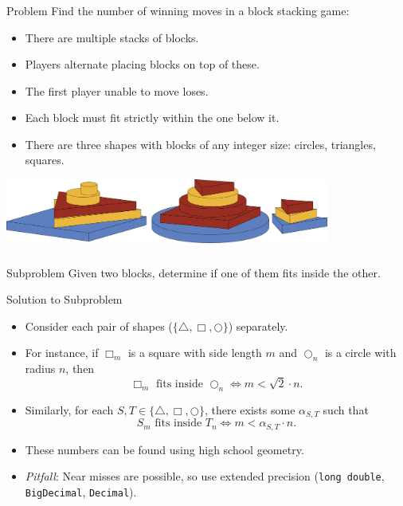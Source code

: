 \begin{frame}
  \frametitle{\problemtitle}
  \begin{block}{Problem}
    Find the number of winning moves in a block stacking game:
    \begin{itemize}
      \item There are multiple stacks of blocks.
      \item Players alternate placing blocks on top of these.
      \item The first player unable to move loses.
      \item Each block must fit strictly within the one below it.
      \item There are three shapes with blocks of any integer size: circles, triangles, squares.
    \end{itemize} 
  \end{block}
  \vspace{5mm}
  \centering
  \includegraphics[width=0.8\textwidth]{image}
\end{frame}
\begin{frame}
  \frametitle{\problemtitle}
  \begin{block}{Subproblem}
    Given two blocks, determine if one of them fits inside the other.
  \end{block}
  \pause
  \begin{block}{Solution to Subproblem}
    \begin{itemize}
      \item<+-> Consider each pair of shapes ($\{\triangle,\Box,\bigcirc\}$) separately.
      \item<+-> For instance, if $\Box_m$ is a square with side length $m$ and $\bigcirc_n$ is a circle with radius $n$, then
        \[ \text{$\Box_m$ fits inside $\bigcirc_n$} \iff m < \sqrt{2}\cdot n. \]
      \item<+-> Similarly, for each $S,T\in\{\triangle,\Box,\bigcirc\}$, there exists some $\alpha_{S,T}$ such that
        \[ \text{$S_m$ fits inside $T_n$} \iff m < \alpha_{S,T}\cdot n. \]
      \item<+-> These numbers can be found using high school geometry. %
      \item<+-> \emph{Pitfall}: Near misses are possible, so use extended precision (\texttt{long double}, \texttt{BigDecimal}, \texttt{Decimal}).
    \end{itemize}
  \end{block}
\end{frame}
